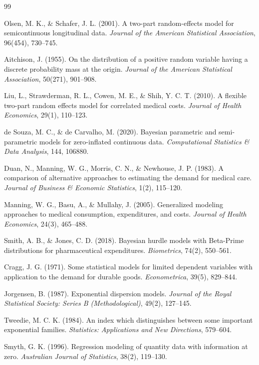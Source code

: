 \documentclass[11pt, a4paper]{article}
\begin{document}
\begin{thebibliography}{99}

 Olsen, M. K., \& Schafer, J. L. (2001). A two-part random-effects model for semicontinuous longitudinal data. \textit{Journal of the American Statistical Association}, 96(454), 730--745.

 Aitchison, J. (1955). On the distribution of a positive random variable having a discrete probability mass at the origin. \textit{Journal of the American Statistical Association}, 50(271), 901--908.

 Liu, L., Strawderman, R. L., Cowen, M. E., \& Shih, Y. C. T. (2010). A flexible two-part random effects model for correlated medical costs. \textit{Journal of Health Economics}, 29(1), 110--123.

 de Souza, M. C., \& de Carvalho, M. (2020). Bayesian parametric and semi-parametric models for zero-inflated continuous data. \textit{Computational Statistics \& Data Analysis}, 144, 106880.

 Duan, N., Manning, W. G., Morris, C. N., \& Newhouse, J. P. (1983). A comparison of alternative approaches to estimating the demand for medical care. \textit{Journal of Business \& Economic Statistics}, 1(2), 115--120.

 Manning, W. G., Basu, A., \& Mullahy, J. (2005). Generalized modeling approaches to medical consumption, expenditures, and costs. \textit{Journal of Health Economics}, 24(3), 465--488.

 Smith, A. B., \& Jones, C. D. (2018). Bayesian hurdle models with Beta-Prime distributions for pharmaceutical expenditures. \textit{Biometrics}, 74(2), 550--561.

 Cragg, J. G. (1971). Some statistical models for limited dependent variables with application to the demand for durable goods. \textit{Econometrica}, 39(5), 829--844.

 Jorgensen, B. (1987). Exponential dispersion models. \textit{Journal of the Royal Statistical Society: Series B (Methodological)}, 49(2), 127--145.

 Tweedie, M. C. K. (1984). An index which distinguishes between some important exponential families. \textit{Statistics: Applications and New Directions}, 579--604.

 Smyth, G. K. (1996). Regression modeling of quantity data with information at zero. \textit{Australian Journal of Statistics}, 38(2), 119--130.


\end{thebibliography}
\end{document}
